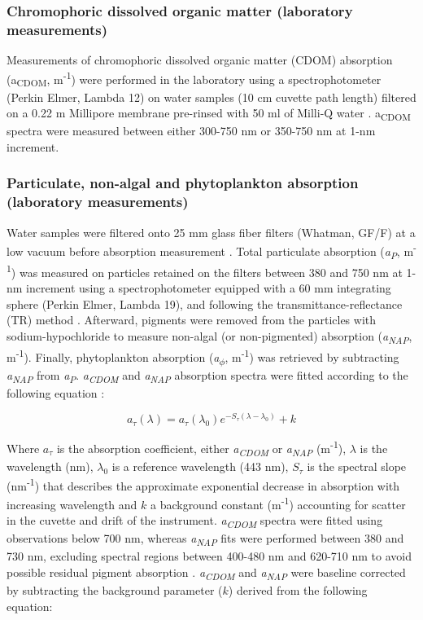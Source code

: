\documentclass[essd, manuscript]{copernicus}
\begin{document}
\subsubsection{Chromophoric dissolved organic matter (laboratory measurements)}

Measurements of chromophoric dissolved organic matter (CDOM) absorption (a\textsubscript{CDOM}, m\textsuperscript{-1}) were performed in the laboratory using a spectrophotometer (Perkin Elmer, Lambda 12) on water samples (10 cm cuvette path length) filtered on a 0.22 \textmu m Millipore membrane pre-rinsed with 50 ml of Milli-Q water \citep{Babin2003b}. a\textsubscript{CDOM} spectra were measured between either 300-750 nm or 350-750 nm at 1-nm increment.

\subsubsection{Particulate, non-algal and phytoplankton absorption (laboratory measurements)}

Water samples were filtered onto 25 mm glass fiber filters (Whatman, GF/F) at a low vacuum before absorption measurement \citep{Babin2003b}. Total particulate absorption (\textit{a\textsubscript{P}}, m\textsuperscript{-1}) was measured on particles retained on the filters between 380 and 750 nm at 1-nm increment using a spectrophotometer equipped with a 60 mm integrating sphere (Perkin Elmer, Lambda 19), and following the transmittance-reflectance (TR) method \citep{Tassan1995, Tassan1998}. Afterward, pigments were removed from the particles with sodium-hypochloride to measure non-algal (or non-pigmented) absorption (\textit{a\textsubscript{NAP}}, m\textsuperscript{-1}). Finally, phytoplankton absorption (\textit{a\textsubscript{$\phi$}}, m\textsuperscript{-1}) was retrieved by subtracting \textit{a\textsubscript{NAP}} from \textit{a\textsubscript{P}}. \textit{a\textsubscript{CDOM}} and \textit{a\textsubscript{NAP}} absorption spectra were fitted according to the following equation \citep{Jerlov1968, Bricaud1981a}:

\begin{equation}
    a_\tau(\lambda) = a_\tau(\lambda_0)e^{-S_\tau(\lambda - \lambda_0)} + k
\end{equation}

Where $a_\tau$ is the absorption coefficient, either \textit{a\textsubscript{CDOM}} or \textit{a\textsubscript{NAP}} (m\textsuperscript{-1}), $\lambda$ is the wavelength (nm), $\lambda_0$ is a reference wavelength (443 nm), $S_\tau$ is the spectral slope (nm\textsuperscript{-1}) that describes the approximate exponential decrease in absorption with increasing wavelength and $k$ a background constant (m\textsuperscript{-1}) accounting for scatter in the cuvette and drift of the instrument. \textit{a\textsubscript{CDOM}} spectra were fitted using observations below 700 nm, whereas \textit{a\textsubscript{NAP}} fits were performed between 380 and 730 nm, excluding spectral regions between 400-480 nm and 620-710 nm to avoid possible residual pigment absorption \citep{Babin2003b}. \textit{a\textsubscript{CDOM}} and \textit{a\textsubscript{NAP}} were baseline corrected by subtracting the background parameter ($k$) derived from the following equation:
\end{document}
